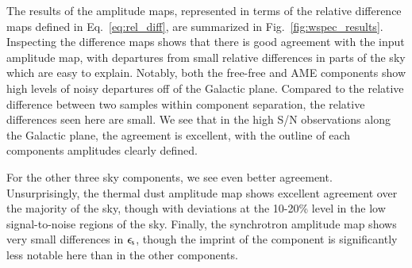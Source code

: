 \documentclass{aa}
\begin{document}
The results of the amplitude maps, represented in terms of the relative difference maps defined in Eq.~\ref{eq:rel_diff}, are summarized in Fig.~\ref{fig:wspec_results}. Inspecting the difference maps shows that there is good agreement with the input amplitude map, with departures from small relative differences in parts of the sky which are easy to explain. Notably, both the free-free and AME components show high levels of noisy departures off of the Galactic plane. Compared to the relative difference between two samples within component separation, the relative differences seen here are small. We see that in the high S/N observations along the Galactic plane, the agreement is excellent, with the outline of each components amplitudes clearly defined.

For the other three sky components, we see even better agreement. Unsurprisingly, the thermal dust amplitude map shows excellent agreement over the majority of the sky, though with deviations at the 10-20\% level in the low signal-to-noise regions of the sky. Finally, the synchrotron amplitude map shows very small differences in $\epsilon_{\rm s}$, though the imprint of the component is significantly less notable here than in the other components.
\end{document}
